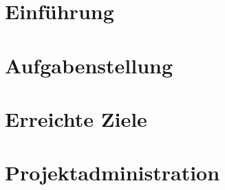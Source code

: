\documentclass[
11pt, %
a4paper, %
BCOR25mm, %
DIV14, %
footsepline = false, %
headsepline, %
twoside, %
openright,
abstracton, %
listof=totocnumbered, %
bibliography=totocnumbered %
]{scrreprt}
\begin{document}
  
  
  \cleardoublepage
      
  
  \chapter{Einführung}
  
    

  \cleardoublepage
 
  
  \chapter{Aufgabenstellung}
  
  

  \cleardoublepage
   
  
  \chapter{Erreichte Ziele}
  
  

  \cleardoublepage
   
    
  \chapter{Projektadministration}
 
  

  \cleardoublepage
   
\end{document}
